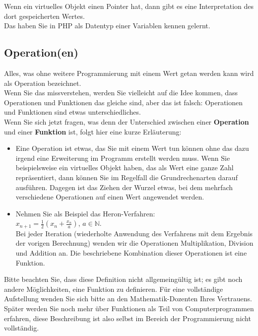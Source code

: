 Wenn ein virtuelles Objekt einen Pointer hat, dann gibt es eine Interpretation des dort gespeicherten Wertes.\\

Das haben Sie in PHP als Datentyp einer Variablen kennen gelernt.

\subsection{Operation(en)}

Alles, was ohne weitere Programmierung mit einem Wert getan werden kann wird als Operation bezeichnet.\\

Wenn Sie das missverstehen, werden Sie vielleicht auf die Idee kommen, dass Operationen und Funktionen das gleiche sind, aber das ist falsch: Operationen und Funktionen sind etwas unterschiedliches.\\

Wenn Sie sich jetzt fragen, was denn der Unterschied zwischen einer \textbf{Operation} und einer \textbf{Funktion} ist, folgt hier eine kurze Erläuterung:

\begin{itemize}
	\item Eine Operation ist etwas, das Sie mit einem Wert tun können ohne das dazu irgend eine Erweiterung im Programm erstellt werden muss. Wenn Sie beispielsweise ein virtuelles Objekt haben, das als Wert eine ganze Zahl repräsentiert, dann können Sie im Regelfall die Grundrechenarten darauf ausführen. Dagegen ist das Ziehen der Wurzel etwas, bei dem mehrfach verschiedene Operationen auf einen Wert angewendet werden.
	\item Nehmen Sie als Beispiel das Heron-Verfahren:\\
	\( x_{n+1} = \frac{1}{2} ( x_n + \frac{x_n}{a} ) \), \(a \in \mathbb{N} \).\\
	Bei jeder Iteration (wiederholte Anwendung des Verfahrens mit dem Ergebnis der vorigen Berechnung) wenden wir die Operationen Multiplikation, Division und Addition an. Die beschriebene Kombination dieser Operationen ist eine Funktion.
\end{itemize}

Bitte beachten Sie, dass diese Definition nicht allgemeingültig ist; es gibt noch andere Möglichkeiten, eine Funktion zu definieren. Für eine vollständige Aufstellung wenden Sie sich bitte an den Mathematik-Dozenten Ihres Vertrauens. Später werden Sie noch mehr über Funktionen als Teil von Computerprogrammen erfahren, diese Beschreibung ist also selbst im Bereich der Programmierung nicht vollständig.\\


